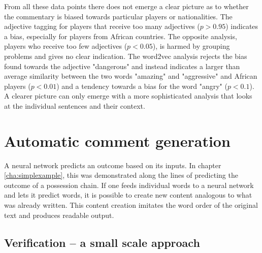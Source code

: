 \documentclass[10pt, a4paper]{UUThesisTemplate}
\begin{document}
From all these data points there does not emerge a clear picture as to whether the commentary is biased towards particular players or nationalities. The adjective tagging for players  that receive too many adjectives ($p>0.95$) indicates a bias, especially for players from African countries. The opposite analysis, players who receive too few adjectives ($p<0.05$), is harmed by grouping problems and gives no clear indication. The word2vec analysis rejects the bias found towards the adjective "dangerous" and instead indicates a larger than average similarity between the two words "amazing" and "aggressive" and African players ($p<0.01$) and a tendency towards a bias for the word "angry" ($p<0.1$). A clearer picture can only emerge with a more sophisticated analysis that looks at the individual sentences and their context.\cleardoublepage

\chapter{Automatic comment generation}\label{cha:autogen}

A neural network predicts an outcome based on its inputs. In chapter \ref{cha:simplexample}, this was demonstrated along the lines of predicting the outcome of a possession chain. If one feeds individual words to a neural network and lets it predict words, it is possible to create new content analogous to what was already written. This content creation imitates the word order of the original text and produces readable output.

\section{Verification – a small scale approach}
\end{document}
